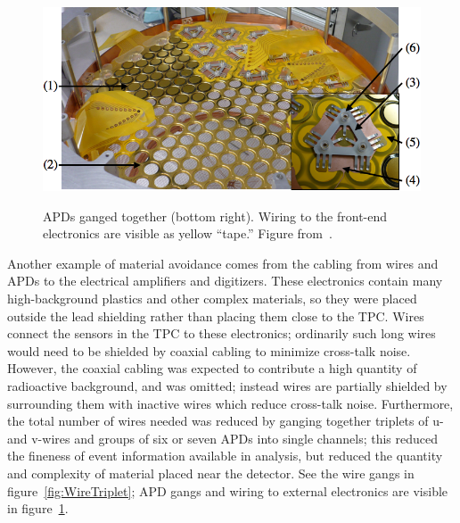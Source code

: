 \begin{figure}
\begin{center}
\includegraphics[keepaspectratio=true,width=\textwidth]{PlatterWGO7.png}
\end{center}
\renewcommand{\baselinestretch}{1}
\small\normalsize
\begin{quote}
\caption{APDs ganged together (bottom right).  Wiring to the front-end electronics are visible as yellow ``tape.''  Figure from~\cite{detectorPartI}.}
\label{fig:APDgang}
\end{quote}
\end{figure}
\renewcommand{\baselinestretch}{2}
\small\normalsize

Another example of material avoidance comes from the cabling from wires and APDs to the electrical amplifiers and digitizers.  These electronics contain many high-background plastics and other complex materials, so they were placed outside the lead shielding rather than placing them close to the TPC.  Wires connect the sensors in the TPC to these electronics; ordinarily such long wires would need to be shielded by coaxial cabling to minimize cross-talk noise.  However, the coaxial cabling was expected to contribute a high quantity of radioactive background, and was omitted; instead wires are partially shielded by surrounding them with inactive wires which reduce cross-talk noise.  Furthermore, the total number of wires needed was reduced by ganging together triplets of u- and v-wires and groups of six or seven APDs into single channels; this reduced the fineness of event information available in analysis, but reduced the quantity and complexity of material placed near the detector.  See the wire gangs in figure~\ref{fig:WireTriplet}; APD gangs and wiring to external electronics are visible in figure~\ref{fig:APDgang}.~\cite{detectorPartI}

